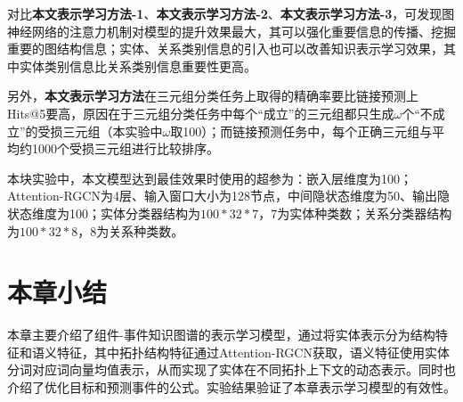 对比\textbf{本文表示学习方法-1}、\textbf{本文表示学习方法-2}、\textbf{本文表示学习方法-3}，可发现图神经网络的注意力机制对模型的提升效果最大，其可以强化重要信息的传播、挖掘重要的图结构信息；实体、关系类别信息的引入也可以改善知识表示学习效果，其中实体类别信息比关系类别信息重要性更高。

另外，\textbf{本文表示学习方法}在三元组分类任务上取得的精确率要比链接预测上Hits@5要高，原因在于三元组分类任务中每个“成立”的三元组都只生成$\omega$个“不成立”的受损三元组（本实验中$\omega$取100）；而链接预测任务中，每个正确三元组与平均约1000个受损三元组进行比较排序。

本块实验中，本文模型达到最佳效果时使用的超参为：嵌入层维度为100；Attention-RGCN为4层、输入窗口大小为128节点，中间隐状态维度为50、输出隐状态维度为100；实体分类器结构为$100*32*7$，7为实体种类数；关系分类器结构为$100*32*8$，8为关系种类数。
\section{本章小结}
本章主要介绍了组件-事件知识图谱的表示学习模型，通过将实体表示分为结构特征和语义特征，其中拓扑结构特征通过Attention-RGCN获取，语义特征使用实体分词对应词向量均值表示，从而实现了实体在不同拓扑上下文的动态表示。同时也介绍了优化目标和预测事件的公式。实验结果验证了本章表示学习模型的有效性。





